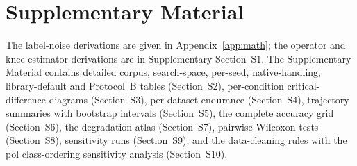 \documentclass[pdflatex,sn-mathphys]{sn-jnl}
\theoremstyle{thmstyleone}
\theoremstyle{thmstyletwo}
\theoremstyle{thmstylethree}
\begin{document}
\section*{Supplementary Material}
The label-noise derivations are given in Appendix~\ref{app:math}; the operator and knee-estimator derivations are in Supplementary Section~S1. The Supplementary Material contains detailed corpus, search-space, per-seed, native-handling, library-default and Protocol~B tables (Section~S2), per-condition critical-difference diagrams (Section~S3), per-dataset endurance (Section~S4), trajectory summaries with bootstrap intervals (Section~S5), the complete accuracy grid (Section~S6), the degradation atlas (Section~S7), pairwise Wilcoxon tests (Section~S8), sensitivity runs (Section~S9), and the data-cleaning rules with the pol class-ordering sensitivity analysis (Section~S10).


\end{document}
